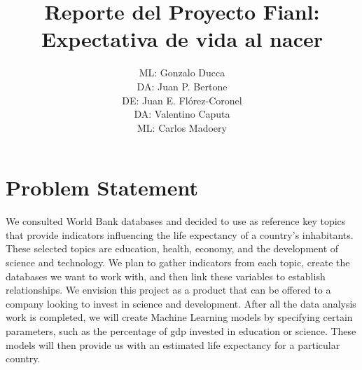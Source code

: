 \documentclass{other/docTemplate}
\author{ML: Gonzalo Ducca \formatemail{gonzaloducca@gmail.com} \\ DA: Juan P. Bertone \formatemail{bertonejpb@gmail.com} \\ DE: Juan E. Flórez-Coronel \formatemail{juan.florez@upr.edu} \\ DA: Valentino Caputa \formatemail{caputavalentino@gmail.com} \\ ML: Carlos Madoery \formatemail{ccmadoery@gmail.com}}
\title{Reporte del Proyecto Fianl: Expectativa de vida al nacer}
\begin{document}
 
\maketitle

\startTable
{}
\stopTable

\tabladecontenido
\newpage
\listadetablas
\newpage
\listadefiguras
\newpage
\printglossary[title=Lista de Acronimos ,type=\acronymtype]
\clearpage




\section{Problem Statement}
We consulted World Bank databases and decided to use as reference key topics that provide indicators influencing the life expectancy of a country's inhabitants. These selected topics are education, health, economy, and the development of science and technology.
We plan to gather indicators from each topic, create the databases we want to work with, and then link these variables to establish relationships. We envision this project as a product that can be offered to a company looking to invest in science and development.
After all the data analysis work is completed, we will create Machine Learning models by specifying certain parameters, such as the percentage of \gls{gdp} invested in education or science. These models will then provide us with an estimated life expectancy for a particular country.
\end{document}

